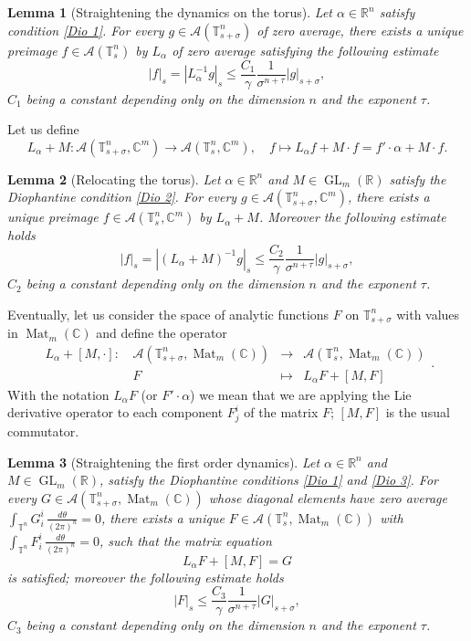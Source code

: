 \documentclass[oneside, 11pt]{amsbook}
\newcommand{\pa}[1]{{\left(#1\right)}}
\newcommand{\abs}[1]{{\left|#1\right|}}
\newcommand{\A}{\mathcal{A}}
\newcommand{\T}{\mathbb{T}}
\newcommand{\R}{\mathbb{R}}
\newcommand{\C}{\mathbb{C}}
\newcommand{\teta}{\theta}
\newcommand{\Mat}{\operatorname{Mat}}
\newcommand{\GL}{\operatorname{GL}}
\newcommand{\amat}[2]{{\begin{array}{#1}#2\end{array}}}
\newcommand{\0}{{(0)}}
\newcommand{\3}{{(3)}}
\newtheorem{lemma}{Lemma}
\numberwithin{equation}{section}
\numberwithin{defn}{section}
\numberwithin{prop}{section}
\numberwithin{cor}{section}
\numberwithin{lemma}{section}
\numberwithin{rmk}{section}
\numberwithin{corollary}{section}
\begin{document}
\begin{lemma}[Straightening the dynamics on the torus]
Let $\alpha\in\R^n$ satisfy condition \eqref{Dio 1}. For every $g\in\mathcal{A}(\T^n_{s+\sigma})$ of zero average, there exists a unique preimage $f\in\mathcal{A}(\T^n_s)$ by $L_\alpha$ of zero average  satisfying the following estimate \[\abs{f}_{s}=\abs{L_{\alpha}^{-1}g}_s\leq \frac{C_1}{\gamma}\frac{1}{ \sigma^{n+\tau}}\abs{g}_{s+\sigma},\] $C_1$ being a constant depending only on the dimension $n$ and the exponent $\tau$. 
\label{tangent lemma}
\end{lemma}


\noindent Let us define
\begin{equation*}
L_\alpha + M : \mathcal{A}(\T^n_{s+\sigma},\C^m) \to \mathcal {A}(\T^n_s,\C^m),\quad f\mapsto L_\alpha f + M\cdot f = f'\cdot \alpha + M\cdot f.
\label{cohomological2}
\end{equation*}
\begin{lemma}[Relocating the torus]
Let $\alpha\in\R^n$ and $M\in\GL_m(\R)$ satisfy the Diophantine condition \eqref{Dio 2}. For every $g\in\mathcal{A}(\T^n_{s+\sigma},\C^m)$, there exists a unique preimage $f\in\mathcal{A}(\T^n_{s},\C^m)$  by $L_\alpha + M$. Moreover the following estimate holds
\[\abs{f}_{s}=\abs{\pa{L_\alpha + M}^{-1} g }_s\leq \frac{C_2}{\gamma}\frac{1}{ \sigma^{n+\tau}}\abs{g}_{s+\sigma}, \] $C_2$ being a constant depending only on the dimension $n$ and the exponent $\tau$.
\label{normal lemma}
\end{lemma} 

\noindent Eventually, let us consider the space of analytic functions $F$ on $\T^n_{s+\sigma}$ with values in $\Mat_m(\C)$ and define the operator 
\begin{equation*}
\amat{llcl}{
L_\alpha + [M, \cdot]:\, & \A(\T^n_{s+\sigma},\Mat_m(\C)) &\to &\A(\T^n_s,\Mat_m(\C))\\
& F &\mapsto &L_\alpha F + [M,F]}.
\label{cohomological3}
\end{equation*}
With the notation $L_\alpha F$ (or $F'\cdot\alpha$) we mean  that we are applying the Lie derivative operator to each component $F^i_j$ of the matrix $F$; $[M,F]$ is the usual commutator.

\begin{lemma}[Straightening the first order dynamics] Let $\alpha\in\R^n$ and $M\in\GL_m(\R)$, satisfy the Diophantine conditions \eqref{Dio 1} and \eqref{Dio 3}. For every $G\in\A(\T^n_{s+\sigma},\Mat_m(\C))$ whose diagonal elements have zero average $\int_{\T^n} G^i_i \, \frac{d\teta}{(2\pi)^n}= 0$, there exists a unique $F\in\A(\T^n_{s},\Mat_m(\C))$ with  $\int_{\T^n} F^i_i \, \frac{d\teta}{(2\pi)^n}= 0$, such that the matrix equation \[L_\alpha F + [M,F] = G\] is satisfied; moreover the following estimate holds
\[\abs{F}_s \leq \frac{C_3}{\gamma}\frac{1}{\sigma^{n+\tau}}\abs{G}_{s+\sigma},\]
$C_3$ being a constant depending only on the dimension $n$ and the exponent $\tau$. 
\label{matrix lemma}
\end{lemma}
\end{document}
